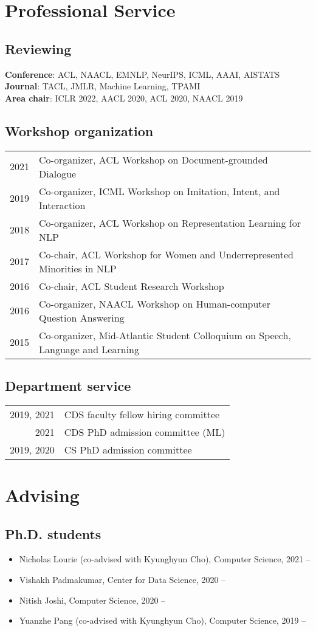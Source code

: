 \documentclass[a4paper,11pt]{article}
\begin{document}
\section{Professional Service}
\subsection{Reviewing}
\textbf{Conference}: ACL, NAACL, EMNLP, NeurIPS, ICML, AAAI, AISTATS \\
\textbf{Journal}: TACL, JMLR, Machine Learning, TPAMI \\
\textbf{Area chair}: ICLR 2022, AACL 2020, ACL 2020, NAACL 2019

\subsection{Workshop organization}
\begin{longtable}{rl}
2021 & Co-organizer, ACL Workshop on Document-grounded Dialogue \\
2019 & Co-organizer, ICML Workshop on Imitation, Intent, and Interaction \\
2018 & Co-organizer, ACL Workshop on Representation Learning for NLP \\
2017 & Co-chair, ACL Workshop for Women and Underrepresented Minorities in NLP \\
2016 & Co-chair, ACL Student Research Workshop \\
2016 & Co-organizer, NAACL Workshop on Human-computer Question Answering \\
2015 & Co-organizer, Mid-Atlantic Student Colloquium on Speech, Language and Learning
\end{longtable}

\subsection{Department service}
\begin{tabular}{rl}
    2019, 2021 & CDS faculty fellow hiring committee \\
    2021 & CDS PhD admission committee (ML) \\
    2019, 2020 & CS PhD admission committee
\end{tabular}

\section{Advising}
\subsection{Ph.D. students}
\begin{itemize}[itemsep=-5pt]
    \item Nicholas Lourie (co-advised with Kyunghyun Cho), Computer Science, 2021 --
    \item Vishakh Padmakumar, Center for Data Science, 2020 --
    \item Nitish Joshi, Computer Science, 2020 --
    \item Yuanzhe Pang (co-advised with Kyunghyun Cho), Computer Science, 2019 --
\end{itemize}
\end{document}

